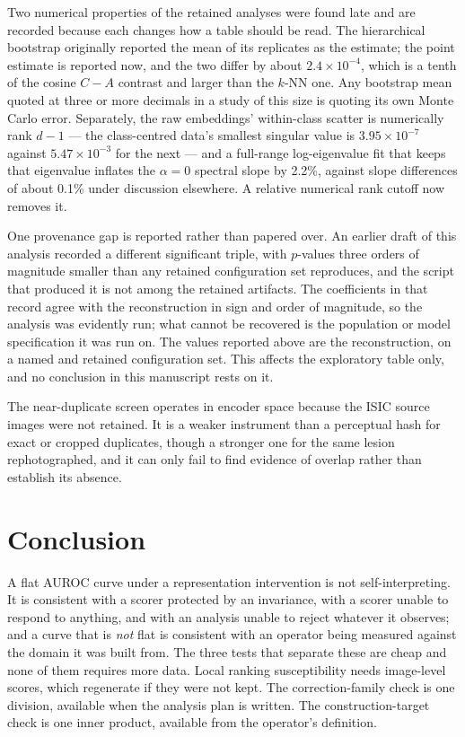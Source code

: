 \documentclass[11pt,a4paper]{article}
\begin{document}
Two numerical properties of the retained analyses were found late and are
recorded because each changes how a table should be read. The hierarchical
bootstrap originally reported the mean of its replicates as the estimate; the
point estimate is reported now, and the two differ by about $2.4\times10^{-4}$,
which is a tenth of the cosine $C-A$ contrast and larger than the $k$-NN one.
Any bootstrap mean quoted at three or more decimals in a study of this size is
quoting its own Monte Carlo error. Separately, the raw embeddings' within-class
scatter is numerically rank $d-1$ --- the class-centred data's smallest singular
value is $3.95\times10^{-7}$ against $5.47\times10^{-3}$ for the next --- and a
full-range log-eigenvalue fit that keeps that eigenvalue inflates the
$\alpha=0$ spectral slope by 2.2\%, against slope differences of about 0.1\%
under discussion elsewhere. A relative numerical rank cutoff now removes it.

One provenance gap is reported rather than papered over. An earlier draft of this analysis recorded a different significant triple, with $p$-values three orders of magnitude smaller than any retained configuration set reproduces, and the script that produced it is not among the retained artifacts. The coefficients in that record agree with the reconstruction in sign and order of magnitude, so the analysis was evidently run; what cannot be recovered is the population or model specification it was run on. The values reported above are the reconstruction, on a named and retained configuration set. This affects the exploratory table only, and no conclusion in this manuscript rests on it.

The near-duplicate screen operates in encoder space because the ISIC source images were not retained. It is a weaker instrument than a perceptual hash for exact or cropped duplicates, though a stronger one for the same lesion rephotographed, and it can only fail to find evidence of overlap rather than establish its absence.

\section{Conclusion}
A flat AUROC curve under a representation intervention is not self-interpreting.
It is consistent with a scorer protected by an invariance, with a scorer unable
to respond to anything, and with an analysis unable to reject whatever it
observes; and a curve that is \emph{not} flat is consistent with an operator
being measured against the domain it was built from. The three tests that
separate these are cheap and none of them requires more data. Local ranking
susceptibility needs image-level scores, which regenerate if they were not
kept. The correction-family check is one division, available when the analysis
plan is written. The construction-target check is one inner product, available
from the operator's definition.
\end{document}
